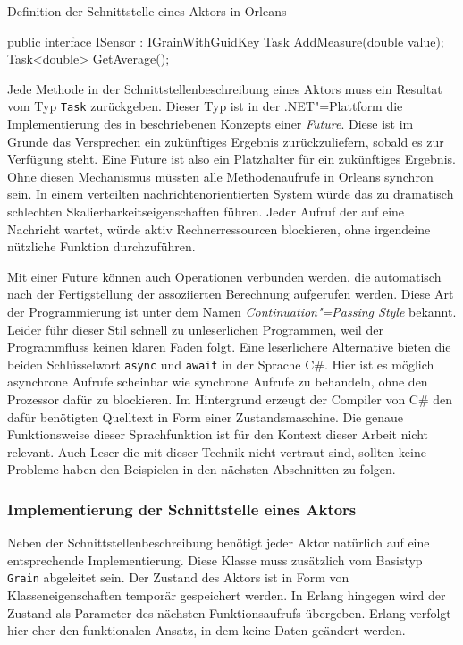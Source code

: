 \begin{program}[!hbt]
\caption{Definition der Schnittstelle eines Aktors in Orleans}
\label{prog:orleans-interface}
\begin{CsCode}
public interface ISensor : IGrainWithGuidKey {
	Task AddMeasure(double value);
	Task<double> GetAverage();
}
\end{CsCode}
\end{program}

Jede Methode in der Schnittstellenbeschreibung eines Aktors muss ein Resultat vom Typ \lstinline{Task} zurückgeben. Dieser Typ ist in der .NET"=Plattform die Implementierung des in \cite{Baker:1977:IGC:800228.806932} beschriebenen Konzepts einer \textit{Future}. Diese ist im Grunde das Versprechen ein zukünftiges Ergebnis zurückzuliefern, sobald es zur Verfügung steht. Eine Future ist also ein Platzhalter für ein zukünftiges Ergebnis. Ohne diesen Mechanismus müssten alle Methodenaufrufe in Orleans synchron sein. In einem verteilten nachrichtenorientierten System würde das zu dramatisch schlechten Skalierbarkeitseigenschaften führen. Jeder Aufruf der auf eine Nachricht wartet, würde aktiv Rechnerressourcen blockieren, ohne irgendeine nützliche Funktion durchzuführen.

Mit einer Future können auch Operationen verbunden werden, die automatisch nach der Fertigstellung der assoziierten Berechnung aufgerufen werden. Diese Art der Programmierung ist unter dem Namen \textit{Continuation"=Passing Style} bekannt. Leider führ dieser Stil schnell zu unleserlichen Programmen, weil der Programmfluss keinen klaren Faden folgt. Eine leserlichere Alternative bieten die beiden Schlüsselwort \lstinline{async} und \lstinline{await} in der Sprache C\#. Hier ist es möglich asynchrone Aufrufe scheinbar wie synchrone Aufrufe zu behandeln, ohne den Prozessor dafür zu blockieren. Im Hintergrund erzeugt der Compiler von C\# den dafür benötigten Quelltext in Form einer Zustandsmaschine. Die genaue Funktionsweise dieser Sprachfunktion ist für den Kontext dieser Arbeit nicht relevant. Auch Leser die mit dieser Technik nicht vertraut sind, sollten keine Probleme haben den Beispielen in den nächsten Abschnitten zu folgen.

\subsubsection{Implementierung der Schnittstelle eines Aktors}

Neben der Schnittstellenbeschreibung benötigt jeder Aktor natürlich auf eine entsprechende Implementierung. Diese Klasse muss zusätzlich vom Basistyp \lstinline{Grain} abgeleitet sein. Der Zustand des Aktors ist in Form von Klasseneigenschaften temporär gespeichert werden. In Erlang hingegen wird der Zustand als Parameter des nächsten Funktionsaufrufs übergeben. Erlang verfolgt hier eher den funktionalen Ansatz, in dem keine Daten geändert werden.


